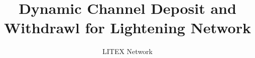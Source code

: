 \documentclass[10pt]{article}
\begin{document}
\title{\huge Dynamic Channel Deposit and Withdrawl for Lightening Network}
\date{}
\author{LITEX Network}
\maketitle


%









%



\end{document}
